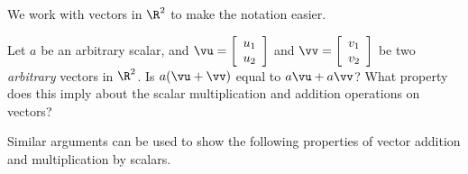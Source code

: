 \begin{activity} \label{act:A1.3_1} We work with vectors in $\R^2$ to make the notation easier. 
	
Let $a$ be an arbitrary scalar, and $\vu = \left[ \begin{array}{c} u_1\\ u_2\end{array} \right]$ and $\vv = \left[ \begin{array}{c} v_1\\ v_2\end{array} \right]$ be two \emph{arbitrary} vectors in $\R^2$. Is $a(\vu + \vv)$ equal to $a\vu + a\vv$? What property does this imply about the scalar multiplication and addition operations on vectors?



\begin{comment}

We use the fact that $v_1$, $v_2$, $u_1$, and $u_2$ are scalars and addition of scalars is commutative to see that
\[\vv + \vu = \left[ \begin{array}{c} v_1\\ v_2\end{array} \right] + \left[ \begin{array}{c} u_1\\ u_2\end{array} \right] = \left[ \begin{array}{c} v_1+u_1\\ v_2 + u_2 \end{array} \right] = \left[ \begin{array}{c} u_1+v_1 \\ u_2+v_2 \end{array} \right] = \left[ \begin{array}{c} u_1 \\ u_2 \end{array} \right] + \left[ \begin{array}{c} v_1 \\ v_2 \end{array} \right]  = \vu + \vv.\]
So the vector sum is a commutative operation. 

\end{comment}

\end{activity}



Similar arguments can be used to show the following properties of vector addition and multiplication by scalars.



